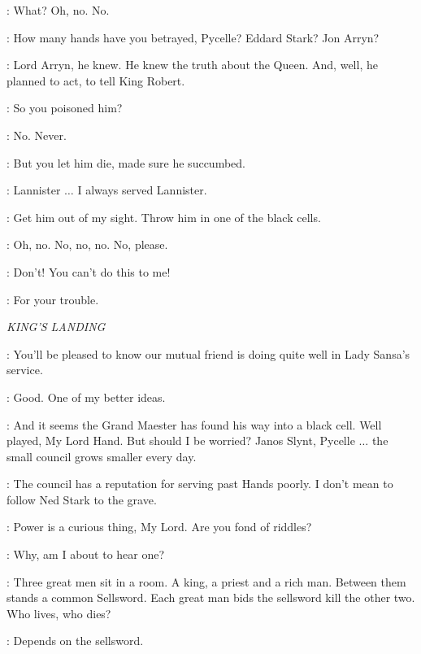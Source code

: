 \PYCELLE: What? Oh, no. No. 


\TYRION: How many hands have you betrayed, Pycelle? Eddard Stark? Jon Arryn? 

\PYCELLE: Lord Arryn, he knew. He knew the truth about the Queen. And, well, he planned to act, to tell King Robert. 

\TYRION: So you poisoned him? 

\PYCELLE: No. Never. 

\TYRION: But you let him die, made sure he succumbed. 

\PYCELLE: Lannister $\ldots$ I always served Lannister. 

\TYRION: Get him out of my sight. Throw him in one of the black cells. 

\PYCELLE: Oh, no. No, no, no. No, please. 


\PYCELLE: Don't! You can't do this to me! 


\TYRION: For your trouble. 


\scene

\textit{KING'S LANDING}


\VARYS: You'll be pleased to know our mutual friend is doing quite well in Lady Sansa's service. 

\TYRION: Good. One of my better ideas. 

\VARYS: And it seems the Grand Maester has found his way into a black cell. Well played, My Lord Hand. But should I be worried? Janos Slynt, Pycelle $\ldots$ the small council grows smaller every day. 

\TYRION: The council has a reputation for serving past Hands poorly. I don't mean to follow Ned Stark to the grave. 

\VARYS: Power is a curious thing, My Lord. Are you fond of riddles? 

\TYRION: Why, am I about to hear one? 

\VARYS: Three great men sit in a room. A king, a priest and a rich man. Between them stands a common Sellsword. Each great man bids the sellsword kill the other two. Who lives, who dies? 

\TYRION: Depends on the sellsword. 

